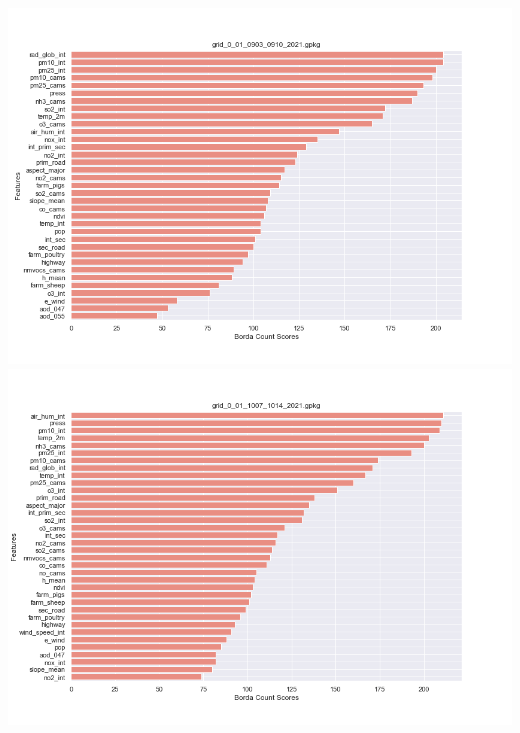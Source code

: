 \begin{center}
\includegraphics[width=.9\textwidth]{images/fs_results/nh3/001/montains/grid_0_01_0903_0910_2021.png}
\includegraphics[width=.9\textwidth]{images/fs_results/nh3/001/montains/grid_0_01_1007_1014_2021.png}
\end{center}

